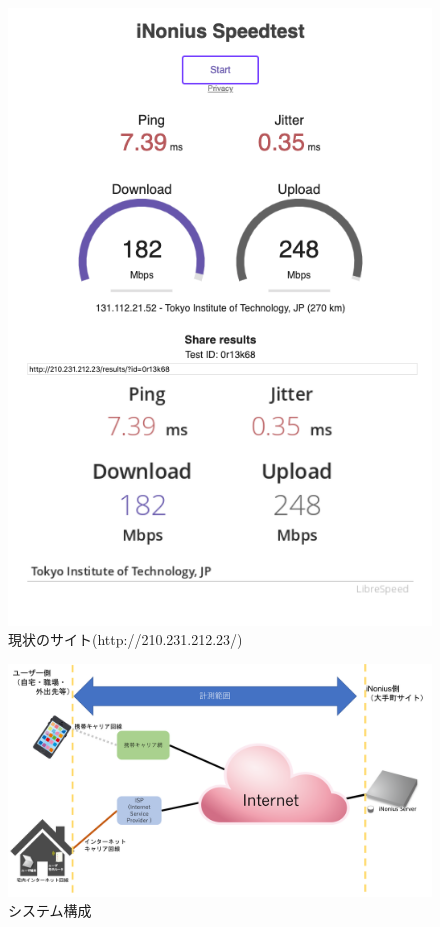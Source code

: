 \documentclass[rinkou,a4paper]{ieicej}
\begin{document}
\begin{figure}[p]
\centering
\includegraphics[scale = 0.4]{Screenshot.png}
\caption{現状のサイト(http://210.231.212.23/)}\label{ss}
\end{figure}

\begin{figure}[p]
\centering
\includegraphics[scale = 0.25]{structure.png}
\caption{システム構成}\label{struct}
\end{figure}
\end{document}
